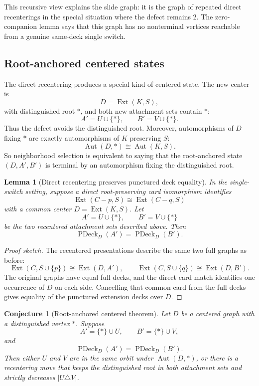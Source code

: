 \documentclass[11pt]{article}
\newtheorem{lemma}{Lemma}
\newtheorem{conjecture}{Conjecture}
\newcommand{\PDeck}{\operatorname{PDeck}}
\newcommand{\Ext}{\operatorname{Ext}}
\newcommand{\Aut}{\operatorname{Aut}}
\begin{document}
This recursive view explains the slide graph: it is the graph of repeated
direct recenterings in the special situation where the defect remains \(2\).
The zero-companion lemma says that this graph has no nonterminal vertices
reachable from a genuine same-deck single switch.

\subsection{Root-anchored centered states}

The direct recentering produces a special kind of centered state.  The new
center is
\[
  D=\Ext(K,S),
\]
with distinguished root \(\ast\), and both new attachment sets contain
\(\ast\):
\[
  A'=U\cup\{\ast\},
  \qquad
  B'=V\cup\{\ast\}.
\]
Thus the defect avoids the distinguished root.  Moreover, automorphisms of
\(D\) fixing \(\ast\) are exactly automorphisms of \(K\) preserving \(S\):
\[
  \Aut(D,\ast)\cong \Aut(K,S).
\]
So neighborhood selection is equivalent to saying that the root-anchored
state \((D,A',B')\) is terminal by an automorphism fixing the distinguished
root.

\begin{lemma}[Direct recentering preserves punctured deck equality]
In the single-switch setting, suppose a direct root-preserving card
isomorphism identifies
\[
  \Ext(C-p,S)
  \cong
  \Ext(C-q,S)
\]
with a common center \(D=\Ext(K,S)\).  Let
\[
  A'=U\cup\{\ast\},
  \qquad
  B'=V\cup\{\ast\}
\]
be the two recentered attachment sets described above.  Then
\[
  \PDeck_D(A')=\PDeck_D(B').
\]
\end{lemma}

\begin{proof}[Proof sketch]
The recentered presentations describe the same two full graphs as before:
\[
  \Ext(C,S\cup\{p\})\cong \Ext(D,A'),
  \qquad
  \Ext(C,S\cup\{q\})\cong \Ext(D,B').
\]
The original graphs have equal full decks, and the direct card match
identifies one occurrence of \(D\) on each side.  Cancelling that common card
from the full decks gives equality of the punctured extension decks over
\(D\).
\end{proof}

\begin{conjecture}[Root-anchored centered theorem]
Let \(D\) be a centered graph with a distinguished vertex \(\ast\).  Suppose
\[
  A'=\{\ast\}\cup U,
  \qquad
  B'=\{\ast\}\cup V,
\]
and
\[
  \PDeck_D(A')=\PDeck_D(B').
\]
Then either \(U\) and \(V\) are in the same orbit under
\(\Aut(D,\ast)\), or there is a recentering move that keeps the distinguished
root in both attachment sets and strictly decreases \(|U\triangle V|\).
\end{conjecture}
\end{document}
